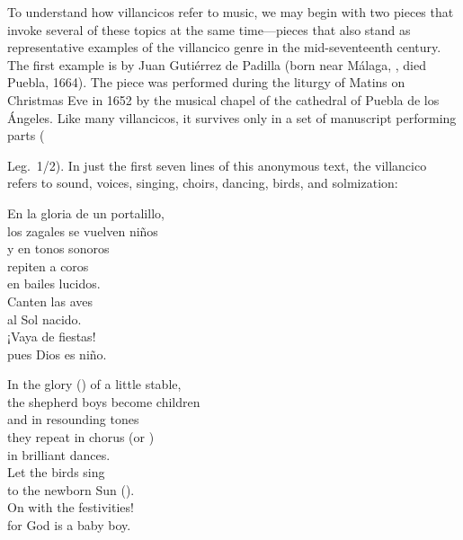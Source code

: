 To understand how villancicos refer to music, we may begin with two pieces that invoke several of these topics at the same time---pieces that also stand as representative examples of the villancico genre in the mid-seventeenth century.
The first example is  by Juan Gutiérrez de Padilla (born near Málaga, , died Puebla, 1664).
The piece was performed during the liturgy of Matins on Christmas Eve in 1652 by the musical chapel of the cathedral of Puebla de los Ángeles.
Like many villancicos, it survives only in a set of manuscript performing parts (\signature{MEX-Pc}{Leg.~1/2}).
In just the first seven lines of this anonymous text, the villancico refers to sound, voices, singing, choirs, dancing, birds, and solmization:
\begin{poemtranslation}
\begin{original}
En la gloria de un portalillo, \\
los zagales se vuelven niños \\
y en tonos sonoros \\
repiten a coros \\
en bailes lucidos. \\
Canten las aves \\
al Sol nacido. \\
¡Vaya de fiestas! \\
pues Dios es niño.
\end{original}
\begin{translation}
In the glory () of a little stable, \\
the shepherd boys become children \\
and in resounding tones \\
they repeat in chorus (or ) \\
in brilliant dances. \\
Let the birds sing \\
to the newborn Sun (). \\
On with the festivities! \\
for God is a baby boy.
\end{translation}
\end{poemtranslation}

